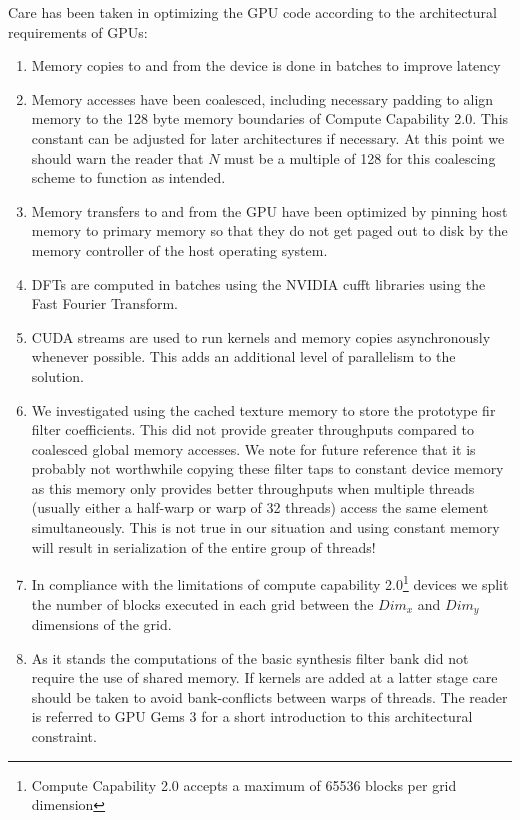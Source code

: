 \documentclass[a4paper,10pt]{article}
\begin{document}
Care has been taken in optimizing the GPU code according to the architectural requirements of GPUs: 
\begin{enumerate}
 \item Memory copies to and from the device is done in batches to improve latency
 \item Memory accesses have been coalesced, including necessary padding to align memory to the 128 byte memory boundaries of Compute Capability 2.0. This constant 
 can be adjusted for later architectures if necessary. At this point we should warn the reader that $N$ must be a multiple of 128 for this coalescing scheme to function
 as intended.
 \item Memory transfers to and from the GPU have been optimized by pinning host memory to primary memory so that they do not get paged out to disk by the memory 
 controller of the host operating system.
 \item DFTs are computed in batches using the NVIDIA cufft libraries using the Fast Fourier Transform.
 \item CUDA streams are used to run kernels and memory copies asynchronously whenever possible. This adds an additional level of parallelism to the solution.
 \item We investigated using the cached texture memory to store the prototype \gls{fir} filter coefficients. This did not provide greater throughputs compared to
 coalesced global memory accesses. We note for future reference that it is probably not worthwhile copying these filter taps to constant device memory as this memory only provides
 better throughputs when multiple threads (usually either a half-warp or warp of 32 threads) access the same element simultaneously. This is not true in our situation and
 using constant memory will result in serialization of the entire group of threads!
 \item In compliance with the limitations of compute capability 2.0\footnote{Compute Capability 2.0 accepts a maximum of 65536 blocks per grid dimension} devices we split the 
 number of blocks executed in each grid between the $Dim_x$ and $Dim_y$ dimensions of the grid.
 \item As it stands the computations of the basic synthesis filter bank did not require the use of shared memory. If kernels are added at a latter stage care should be taken
 to avoid bank-conflicts between warps of threads. The reader is referred to GPU Gems 3 \cite[ch. 3]{harris2007parallel} for a short introduction to this architectural constraint.
\end{enumerate}
\end{document}
